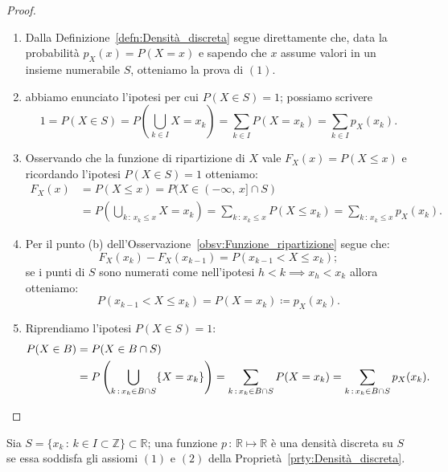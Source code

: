         \begin{proof}
            \hfill
            \begin{enumerate}
                \item Dalla Definizione~\ref{defn:Densità_discreta} segue direttamente che, data la probabilità $p_X(x) = P(X = x)$ e sapendo che $x$ assume valori in un insieme numerabile $S$, otteniamo la prova di $(1)$.
                \item abbiamo enunciato l'ipotesi per cui $P(X \in S) = 1$; possiamo scrivere  \[
                        1 = P(X \in S) = P\left( \bigcup_{k \in I} {X = x_k} \right) = \sum_{k \in I} P(X = x_k) = \sum_{k \in I} p_X(x_k)
                .\]
                \item Osservando che la funzione di ripartizione di $X$ vale $F_X(x) = P(X \leq x)$ e ricordando l'ipotesi $P(X \in S) = 1$ otteniamo:
                \begin{align*}
                    F_X(x) &= P(X \leq x) = P(X \in (-\infty,\,x] \cap S) \\
                           &= P\left( \bigcup_{k \,:\, x_k \leq x} {X = x_k}\right) = \sum_{k \,:\, x_k \leq x} P(X \leq x_k) = \sum_{k \,:\, x_k \leq x} p_X(x_k)
                .\end{align*}
                \item Per il punto (b) dell'Osservazione~\ref{obsv:Funzione_ripartizione} segue che: \[
                    F_X(x_k) - F_X(x_{k-1}) = P(x_{k-1} < X \leq x_k)
                ;\] se i punti di $S$ sono numerati come nell'ipotesi $h < k \implies x_h < x_k$ allora otteniamo: \[
                    P(x_{k-1} < X \leq x_k) = P(X = x_k) \coloneqq p_X(x_k)
                .\]
            \item Riprendiamo l'ipotesi $P(X \in S) = 1$:
                \begin{align*}
                    P(X \in B) &= P(X \in B \cap S) \\
                               &= P\left(\bigcup_{k\,:\,x_k \in B \cap S} \{X = x_k\}\right) = \sum_{k\,:\,x_k \in B \cap S} P(X = x_k) = \sum_{k\,:\,x_k \in B \cap S} p_X(x_k)
                .\qedhere
                \end{align*}
            \end{enumerate}
        \end{proof}
        \begin{obsv}
            Sia $S = \{x_k\,:\,k \in I \subset \mathbb{Z}\} \subset \mathbb{R}$; una funzione $p\,:\, \mathbb{R} \mapsto \mathbb{R}$ è una densità discreta su $S$ se essa soddisfa gli assiomi $(1)$ e $(2)$  della Proprietà~\ref{prty:Densità_discreta}.
        \end{obsv}
